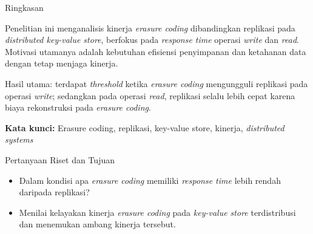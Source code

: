 \documentclass[a2,portrait]{config/poster/a0poster}
\newcommand{\postersection}[1]{%
	\begin{tcolorbox}[
		colback=MainBlue,
		colframe=MainBlue,
		fonttitle=\bfseries,
		coltext=white,
		sharp corners,
		boxrule=0pt,
		top=0pt,
		bottom=0pt,
		halign=center
	]
	\normalsize #1
	\end{tcolorbox}%
}
\begin{document}
\begin{multicols}{2} %
\normalsize %

\newcommand{\onecolimg}[2]{%
	\begin{center}
		\parbox{\columnwidth}{%
			\centering
			\texttt{[image: \#1]}
			\captionof{figure}{#2}
		}
	\end{center}
}


\postersection{Ringkasan}
\noindent Penelitian ini menganalisis kinerja \textit{erasure coding} dibandingkan replikasi pada \textit{distributed key-value store}, berfokus pada \textit{response time} operasi \textit{write} dan \textit{read}. Motivasi utamanya adalah kebutuhan efisiensi penyimpanan dan ketahanan data dengan tetap menjaga kinerja.


\noindent Hasil utama: terdapat \textit{threshold} ketika \textit{erasure coding} mengungguli replikasi pada operasi \textit{write}; sedangkan pada operasi \textit{read}, replikasi selalu lebih cepat karena biaya rekonstruksi pada \textit{erasure coding}.
\newline
\vspace*{-0.5cm}

\noindent \textbf{Kata kunci:} Erasure coding, replikasi, key-value store, kinerja, \textit{distributed systems}


\postersection{Pertanyaan Riset dan Tujuan}
\begin{itemize}
	\item Dalam kondisi apa \textit{erasure coding} memiliki \textit{response time} lebih rendah daripada replikasi?
\end{itemize}
\begin{itemize}
	\item Menilai kelayakan kinerja \textit{erasure coding} pada \textit{key-value store} terdistribusi dan menemukan ambang kinerja tersebut.
\end{itemize}


\end{multicols}
\end{document}
